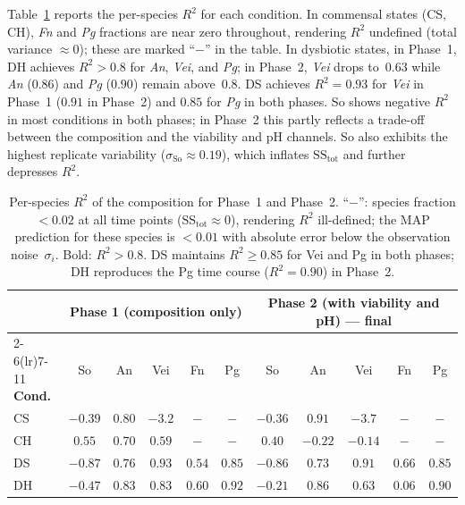 \documentclass[pdflatex,sn-mathphys-num,lineno]{sn-jnl}
\begin{document}
Table~\ref{tab:r2_species} reports the per-species $R^2$ for each condition.
In commensal states (CS, CH), \textit{Fn} and \textit{Pg} fractions are near zero throughout, rendering $R^2$ undefined (total variance $\approx0$); these are marked ``$-$'' in the table.
In dysbiotic states, in Phase~1, DH achieves $R^2>0.8$ for \textit{An}, \textit{Vei}, and \textit{Pg}; in Phase~2, \textit{Vei} drops to~$0.63$ while \textit{An} ($0.86$) and \textit{Pg} ($0.90$) remain above~$0.8$.
DS achieves $R^2=0.93$ for \textit{Vei} in Phase~1 ($0.91$ in Phase~2) and $0.85$ for \textit{Pg} in both phases.
So shows negative $R^2$ in most conditions in both phases; in Phase~2 this partly reflects a trade-off between the composition and the viability and pH channels.
So also exhibits the highest replicate variability ($\sigma_{\mathrm{So}}\approx0.19$), which inflates $\mathrm{SS}_{\mathrm{tot}}$ and further depresses $R^2$.

\begin{table}[htbp]
\centering\footnotesize\setlength{\tabcolsep}{3pt}
\begin{tabular}{@{}l ccccc ccccc@{}}
\toprule
& \multicolumn{5}{c}{\textbf{Phase 1 (composition only)}} & \multicolumn{5}{c}{\textbf{Phase 2 (with viability and pH) --- final}}\\
\cmidrule(lr){2-6}\cmidrule(lr){7-11}
\textbf{Cond.} & So & An & Vei & Fn & Pg & So & An & Vei & Fn & Pg\\
\midrule
CS  & $-0.39$ & $0.80$ & $-3.2$ & $-$ & $-$ & $-0.36$ & $\mathbf{0.91}$ & $-3.7$ & $-$ & $-$\\
CH  & $0.55$  & $0.70$ & $0.59$  & $-$ & $-$ & $0.40$  & $-0.22$ & $-0.14$ & $-$ & $-$\\
DS  & $-0.87$ & $0.76$ & $\mathbf{0.93}$ & $0.54$ & $\mathbf{0.85}$ & $-0.86$ & $0.73$ & $\mathbf{0.91}$ & $0.66$ & $\mathbf{0.85}$\\
DH  & $-0.47$ & $\mathbf{0.83}$ & $\mathbf{0.83}$ & $0.60$ & $\mathbf{0.92}$ & $-0.21$ & $\mathbf{0.86}$ & $0.63$ & $0.06$ & $\mathbf{0.90}$\\
\bottomrule
\end{tabular}
\caption{Per-species $R^2$ of the composition for Phase~1 and Phase~2.
``$-$'': species fraction $<0.02$ at all time points ($\mathrm{SS}_{\mathrm{tot}}\approx0$), rendering $R^2$ ill-defined; the MAP prediction for these species is $<0.01$ with absolute error below the observation noise~$\sigma_i$.
Bold: $R^2>0.8$.
DS maintains $R^2\geq0.85$ for Vei and Pg in both phases; DH reproduces the Pg time course ($R^2=0.90$) in Phase~2.}
\label{tab:r2_species}
\end{table}
\end{document}
